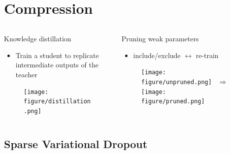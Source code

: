 \documentclass{beamer}
\begin{document}


\section{Compression} %
\label{sec:compression}

\begin{frame}[c]{\insertsection}
\begin{columns}[T]
  \begin{column}{0.48\linewidth}
    Knowledge distillation \citep{hinton_distilling_2015}
    \begin{itemize}
      \item Train a student to replicate intermediate outputs of the teacher
    \end{itemize}
    \begin{figure}
      \centering
      \texttt{[image: figure/distillation.png]}
    \end{figure}
  \end{column}
  \hfill%
  \begin{column}{0.48\linewidth}
    Pruning weak parameters \citep{zhu_prune_2018}
    \begin{itemize}
      \item include/exclude $\leftrightarrow$ re-train
    \end{itemize}
    \begin{figure}
      \centering
      \texttt{[image: figure/unpruned.png]}
      ~$\Rightarrow$
      \texttt{[image: figure/pruned.png]}
    \end{figure}
  \end{column}
\end{columns}
\end{frame}

\subsection{Sparse Variational Dropout} %
\label{sub:sparse_variational_dropout}
\end{document}
